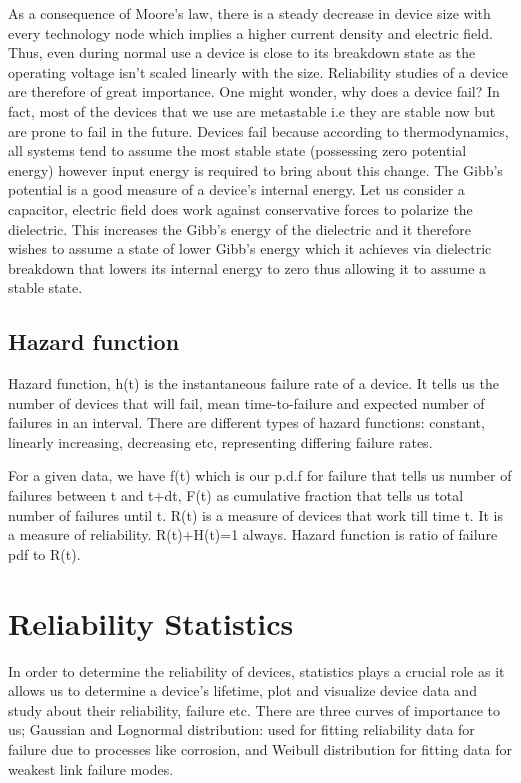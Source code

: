 As a consequence of Moore’s law, there is a steady decrease in device size with every technology node which implies a higher current density and electric field. Thus, even during normal use a device is close to its breakdown state as the operating voltage isn’t scaled linearly with the size. Reliability studies of a device are therefore of great importance.
One might wonder, why does a device fail? In fact, most of the devices that we use are metastable i.e they are stable now but are prone to fail in the future. Devices fail because according to thermodynamics, all systems tend to assume the most stable state (possessing zero potential energy) however input energy is required to bring about this change. The Gibb’s potential is a good measure of a device’s internal energy. Let us consider a capacitor, electric field does work against conservative forces to polarize the dielectric. This increases the Gibb’s energy of the dielectric and it therefore wishes to assume a state of lower Gibb’s energy which it achieves via dielectric breakdown that lowers its internal energy to zero thus allowing it to assume a stable state.
\subsection{Hazard function}
Hazard function, h(t) is the instantaneous failure rate of a device. It tells us the number of devices that will fail, mean time-to-failure and expected number of failures in an interval. There are different types of hazard functions: constant, linearly increasing, decreasing etc, representing differing failure rates. 

For a given data, we have f(t) which is our p.d.f for failure that tells us number of failures between t and t+dt, F(t) as cumulative fraction that tells us total number of failures until t. R(t) is a measure of devices that work till time t. It is a measure of reliability. R(t)+H(t)=1 always. Hazard function is ratio of failure pdf to R(t).

\section{Reliability Statistics}
In order to determine the reliability of devices, statistics plays a crucial role as it allows us to determine a device’s lifetime, plot and visualize device data and study about their reliability, failure etc. There are three curves of importance to us; Gaussian and Lognormal distribution: used for fitting reliability data for failure due to processes like corrosion, and Weibull distribution for fitting data for weakest link failure modes.


